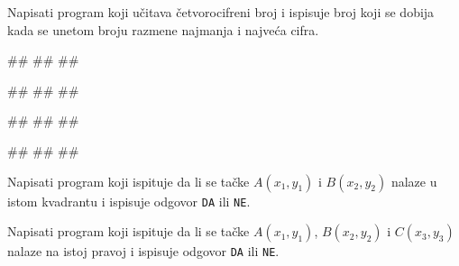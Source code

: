 \begin{Exercise}[label=p1.2_08] 
 Napisati program koji učitava četvorocifreni broj i ispisuje broj koji se dobija kada se unetom broju razmene najmanja i najveća cifra. 

\begin{miditest}
\begin{upotreba}{1}
#\naslovInt#
##
##
\end{upotreba}
\end{miditest}
\begin{miditest}
\begin{upotreba}{2}
#\naslovInt#
##
##
\end{upotreba}
\end{miditest}

\begin{miditest}
\begin{upotreba}{3}
#\naslovInt#
##
##
\end{upotreba}
\end{miditest}
\begin{miditest}
\begin{upotreba}{4}
#\naslovInt#
##
##
\end{upotreba}
\end{miditest}

\end{Exercise}
\ifresenja
 \begin{Answer}[ref=p1.2_08]
\end{Answer}
\fi

\begin{Exercise}[label=p1_19]
Napisati program koji ispituje da li se tačke $A(x_1, y_1)$ i $B(x_2, y_2)$ nalaze u istom kvadrantu i ispisuje odgovor
\verb|DA| ili \verb|NE|. 

\end{Exercise}


\begin{Exercise}[label=p1_20]
Napisati program koji ispituje da li se tačke $A(x_1, y_1)$, $B(x_2, y_2)$ i $C(x_3, y_3)$ nalaze na istoj pravoj i
ispisuje odgovor \verb|DA| ili \verb|NE|. \\

\end{Exercise}


